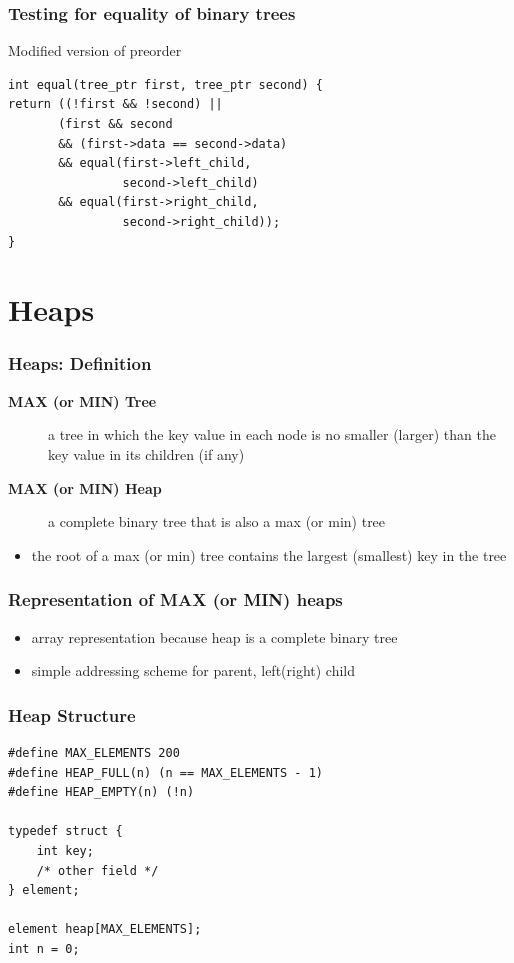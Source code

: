 \documentclass[newPxFont,sthlmFooter,nooffset]{beamer}
\begin{document}
\begin{frame}[t, fragile]
  \frametitle{Testing for equality of binary trees}
Modified version of preorder
\begin{lstlisting}
int equal(tree_ptr first, tree_ptr second) {
return ((!first && !second) || 
       (first && second 
       && (first->data == second->data) 
       && equal(first->left_child,
                second->left_child) 
       && equal(first->right_child,
                second->right_child));
}
\end{lstlisting}
\end{frame}

\section{Heaps}
\begin{frame}[t]
  \frametitle{Heaps: Definition}
  \begin{description}
  \item[\textbf{MAX (or MIN) Tree}] a tree in which the key value in each node is no smaller (larger) than the key value in its children (if any)
  \item [\textbf{MAX (or MIN) Heap}] a complete binary tree that is also a max (or min) tree
  \end{description}
  \begin{itemize}
  \item the root of a max (or min) tree contains the largest (smallest) key in the tree
  \end{itemize}
\end{frame}


\begin{frame}[t]
  \frametitle{Representation of MAX (or MIN) heaps}
  \begin{itemize}
  \item array representation because heap is a complete binary tree

  \item simple addressing scheme for parent, left(right) child
  \end{itemize}

\end{frame}


\begin{frame}[t, fragile]
  \frametitle{Heap Structure}
  \begin{lstlisting}
#define MAX_ELEMENTS 200
#define HEAP_FULL(n) (n == MAX_ELEMENTS - 1) 
#define HEAP_EMPTY(n) (!n)

typedef struct {
    int key;
    /* other field */ 
} element;

element heap[MAX_ELEMENTS]; 
int n = 0;    
  \end{lstlisting}
\end{frame}
\end{document}
